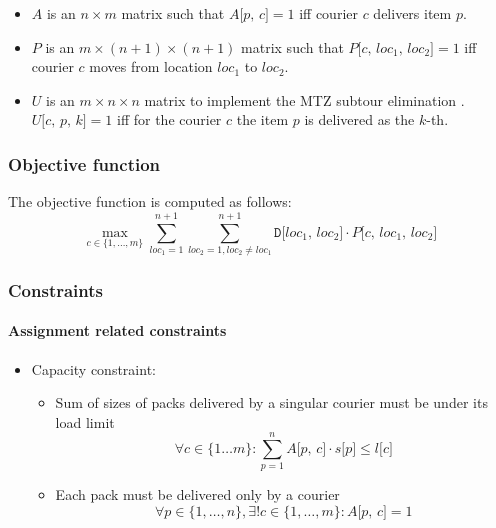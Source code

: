 \begin{itemize}
    \item $A$ is an $n \times m$ matrix such that $A\texttt{[$p$, $c$]} = 1$ iff courier $c$ delivers item $p$.

    \item $P$ is an $m \times (n+1) \times (n+1)$ matrix such that $P\texttt{[$c$, $loc_1$, $loc_2$]} = 1$ iff courier $c$ moves from location $loc_1$ to $loc_2$.

    \item $U$ is an $m \times n \times n$ matrix to implement the MTZ subtour elimination \cite{mtz_subtour}. $U\texttt{[$c$, $p$, $k$]} = 1$ iff for the courier $c$ the item $p$ is delivered as the $k$-th.
\end{itemize}

\subsubsection{Objective function}

The objective function is computed as follows:
\begin{equation}
    \label{eq:obj_fun}
    \max_{c \in \{ 1, \dots, m \}}
    \sum_{loc_1=1}^{n+1} \sum_{loc_2=1, loc_2 \neq loc_1}^{n+1} \texttt{D[$loc_1$, $loc_2$]} \cdot P\texttt{[$c$, $loc_1$, $loc_2$]}
\end{equation}


\subsubsection{Constraints}

\paragraph*{Assignment related constraints}

\begin{itemize}
    \item Capacity constraint:
    \begin{itemize}
        \item Sum of sizes of packs delivered by a singular courier must be under its load limit
        \begin{equation}
            \label{eq:capacity1}
            \forall c \in \{1 \ldots m\}:
            \sum_{p=1}^{n} A\texttt{[$p$, $c$]} \cdot s\texttt{[$p$]} \leq \texttt{$l$[$c$]}
        \end{equation}
        \item Each pack must be delivered only by a courier
        \begin{equation}
            \label{eq:capacity2}
            \forall p \in \{1, \ldots, n\}, \exists! c \in \{1, \ldots, m\}: A\texttt{[$p$, $c$]} = 1
        \end{equation}
    \end{itemize}
\end{itemize}

